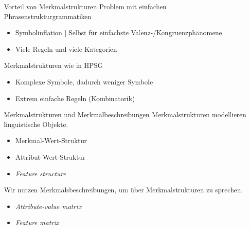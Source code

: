 \begin{frame}
  {Vorteil von Merkmalstrukturen}
  \onslide<+->
  \onslide<+->
  Problem mit einfachen \alert{Phrasenstrukturgrammatiken}\\
  \Halbzeile
  \begin{itemize}[<+->]
    \item \alert{Symbolinflation} | Selbst für einfachste Valenz-\slash Kongruenzphänomene
    \item Viele Regeln und viele Kategorien
  \end{itemize}
  \onslide<+->
  \Zeile
  \alert{Merkmalstrukturen} wie in HPSG\\
  \Halbzeile
  \begin{itemize}[<+->]
    \item \alert{Komplexe Symbole}, dadurch weniger Symbole
    \item Extrem einfache \alert{Regeln} (Kombinatorik)
  \end{itemize}
\end{frame}

\begin{frame}
  {Merkmalstrukturen und Merkmalbeschreibungen}
  \onslide<+->
  \onslide<+->
  \alert{Merkmalstrukturen} modellieren linguistische Objekte.\\
  \Halbzeile
  \begin{itemize}[<+->]
    \item Merkmal-Wert-Struktur
    \item Attribut-Wert-Struktur
    \item \emph{Feature structure}
  \end{itemize}
  \onslide<+->
  \Zeile
  Wir nutzen \alert{Merkmalsbeschreibungen}, um über Merkmalstrukturen zu sprechen.\\
  \Halbzeile
  \begin{itemize}[<+->]
    \item \emph{Attribute-value matrix}
    \item \emph{Feature matrix}
  \end{itemize}
  \onslide<+->
  \Zeile
  \centering 
\end{frame}


